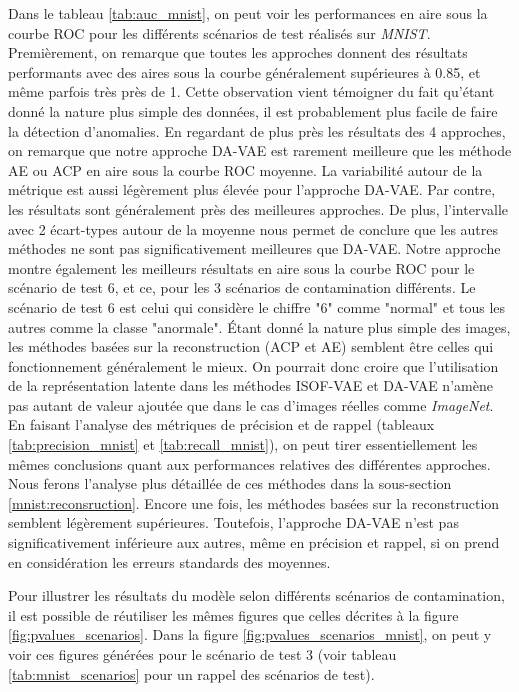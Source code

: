 Dans le tableau \ref{tab:auc_mnist}, on peut voir les performances en aire sous la courbe ROC pour les différents scénarios de test réalisés sur \textit{MNIST}. Premièrement, on remarque que toutes les approches donnent des résultats performants avec des aires sous la courbe généralement supérieures à 0.85, et même parfois très près de 1. Cette observation vient témoigner du fait qu'étant donné la nature plus simple des données, il est probablement plus facile de faire la détection d'anomalies. En regardant de plus près les résultats des 4 approches, on remarque que notre approche DA-VAE est rarement meilleure que les méthode AE ou ACP en aire sous la courbe ROC moyenne. La variabilité autour de la métrique est aussi légèrement plus élevée pour l'approche DA-VAE. Par contre, les résultats sont généralement près des meilleures approches. De plus, l'intervalle avec 2 écart-types autour de la moyenne nous permet de conclure que les autres méthodes ne sont pas significativement meilleures que DA-VAE. Notre approche montre également les meilleurs résultats en aire sous la courbe ROC pour le scénario de test 6, et ce, pour les 3 scénarios de contamination différents. Le scénario de test 6 est celui qui considère le chiffre "6" comme "normal" et tous les autres comme la classe "anormale". Étant donné la nature plus simple des images, les méthodes basées sur la reconstruction (ACP et AE) semblent être celles qui fonctionnement généralement le mieux. On pourrait donc croire que l'utilisation de la représentation latente dans les méthodes ISOF-VAE et DA-VAE n'amène pas autant de valeur ajoutée que dans le cas d'images réelles comme \textit{ImageNet}. En faisant l'analyse des métriques de précision et de rappel (tableaux \ref{tab:precision_mnist} et \ref{tab:recall_mnist}), on peut tirer essentiellement les mêmes conclusions quant aux performances relatives des différentes approches. Nous ferons l'analyse plus détaillée de ces méthodes dans la sous-section \ref {mnist:reconsruction}. Encore une fois, les méthodes basées sur la reconstruction semblent légèrement supérieures. Toutefois, l'approche DA-VAE n'est pas significativement inférieure aux autres, même en précision et rappel, si on prend en considération les erreurs standards des moyennes.

Pour illustrer les résultats du modèle selon différents scénarios de contamination, il est possible de réutiliser les mêmes figures que celles décrites à la figure \ref{fig:pvalues_scenarios}. Dans la figure \ref{fig:pvalues_scenarios_mnist}, on peut y voir ces figures générées pour le scénario de test 3 (voir tableau \ref{tab:mnist_scenarios} pour un rappel des scénarios de test).


